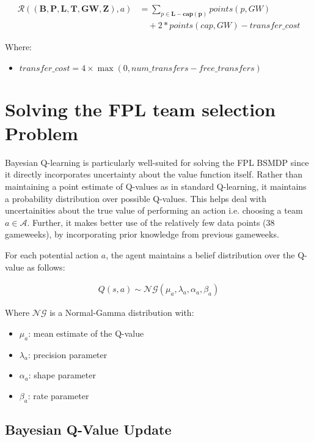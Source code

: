 \begin{align}
\mathcal{R}((\mathbf{B}, \mathbf{P}, \mathbf{L}, \mathbf{T}, \mathbf{GW}, \mathbf{Z}), a) &= \sum_{p \in \mathbf{L - cap(p)}} points(p, GW) \nonumber \\
&\quad + 2*points(cap, GW) - transfer\_cost
\end{align}

Where:
\begin{itemize}
    \item $transfer\_cost = 4 \times \max(0, num\_transfers - free\_transfers)$
\end{itemize}


\section{Solving the FPL team selection Problem}
Bayesian Q-learning is particularly well-suited for solving the FPL BSMDP since it directly incorporates uncertainty about the value function itself. Rather than maintaining a point estimate of Q-values as in standard Q-learning, it maintains a probability distribution over possible Q-values. This helps deal with uncertainities about the true value of performing an action i.e. choosing a team $a \in \mathcal{A}$. Further, it makes better use of the relatively few data points (38 gameweeks), by incorporating prior knowledge from previous gameweeks.

For each potential action $a$, the agent maintains a belief distribution over the Q-value as follows:

\begin{align}
    Q(s, a) \sim \mathcal{NG}(\mu_{a}, \lambda_{a}, \alpha_{a}, \beta_{a})
\end{align}

Where $\mathcal{NG}$ is a Normal-Gamma distribution with:
\begin{itemize}
    \item $\mu_{a}$: mean estimate of the Q-value
    \item $\lambda_{a}$: precision parameter
    \item $\alpha_{a}$: shape parameter
    \item $\beta_{a}$: rate parameter
\end{itemize}

\subsection{Bayesian Q-Value Update}

